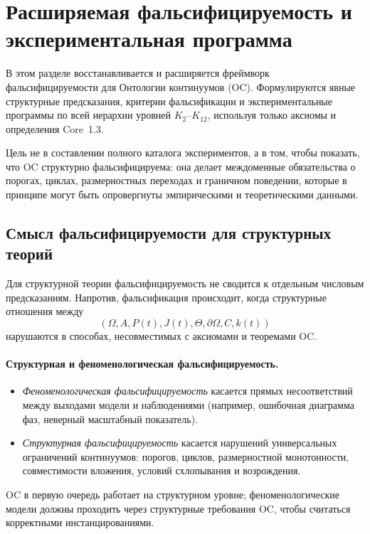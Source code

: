 
\section{Расширяемая фальсифицируемость и экспериментальная программа}
\label{sec:falsifiability-extended}

В этом разделе восстанавливается и расширяется фреймворк фальсифицируемости
для Онтологии континуумов (OC). Формулируются явные структурные
предсказания, критерии фальсификации и экспериментальные программы по всей
иерархии уровней \(K_2\)–\(K_{12}\), используя только аксиомы и
определения Core~1.3.

Цель не в составлении полного каталога экспериментов, а в том, чтобы показать,
что OC структурно фальсифицируема: она делает междоменные обязательства
о порогах, циклах, размерностных переходах и граничном поведении, которые
в принципе могут быть опровергнуты эмпирическими и теоретическими данными.

\subsection{Смысл фальсифицируемости для структурных теорий}

Для структурной теории фальсифицируемость не сводится к отдельным числовым
предсказаниям. Напротив, фальсификация происходит, когда структурные
отношения между
\[
  (\Omega, A, P(t), J(t),
   \Theta, \partial\Omega, C, k(t))
\]
нарушаются в способах, несовместимых с аксиомами и теоремами OC.

\paragraph{Структурная и феноменологическая фальсифицируемость.}
\begin{itemize}
  \item \emph{Феноменологическая фальсифицируемость} касается прямых
        несоответствий между выходами модели и наблюдениями (например,
        ошибочная диаграмма фаз, неверный масштабный показатель).
  \item \emph{Структурная фальсифицируемость} касается нарушений
        универсальных ограничений континуумов: порогов, циклов,
        размерностной монотонности, совместимости вложения, условий
        схлопывания и возрождения.
\end{itemize}
OC в первую очередь работает на структурном уровне; феноменологические модели
должны проходить через структурные требования OC, чтобы считаться корректными
инстанцированиями.

